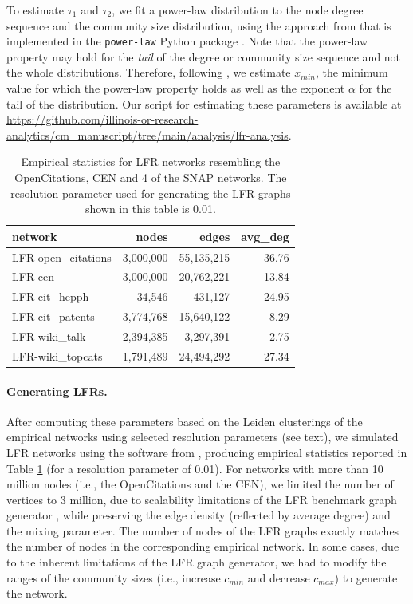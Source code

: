 \documentclass[11pt]{article}   	%
\begin{document}
To estimate $\tau_1$ and $\tau_2$, we fit a power-law distribution to the node degree sequence and the community size distribution, using the approach from \cite{clauset2009power} that is implemented in the \texttt{power-law} Python package \citep{alstott2014powerlaw}. Note that the power-law property may hold for the \textit{tail} of the degree or community size sequence and not the whole distributions. Therefore, following \cite{clauset2009power}, we estimate $x_{min}$, the minimum value for which the power-law property holds as well as the exponent $\alpha$ for the tail of the distribution. Our script for estimating these parameters is available at \href{https://github.com/illinois-or-research-analytics/cm_manuscript/tree/main/analysis/lfr-analysis}{https://github.com/illinois-or-research-analytics/cm\_manuscript/tree/main/analysis/lfr-analysis}.


\begin{table}[ht]
\caption{Empirical statistics for LFR networks resembling the OpenCitations, CEN and 4 of the SNAP networks. The resolution parameter used for generating the LFR graphs shown in this table is 0.01.}
\centering
\begin{tabular}{lrrr}
  \hline
 network & nodes & edges & avg\_deg \\
  \hline
    LFR-open\_citations & 3,000,000  & 55,135,215 & 36.76 \\
    LFR-cen & 3,000,000 & 20,762,221 & 13.84 \\
    LFR-cit\_hepph &  34,546 & 431,127 & 24.95 \\
    LFR-cit\_patents & 3,774,768 & 15,640,122 & 8.29 \\
    LFR-wiki\_talk & 2,394,385 & 3,297,391 & 2.75 \\
    LFR-wiki\_topcats & 1,791,489 & 24,494,292 & 27.34 \\
 \hline
\end{tabular}
\label{tab:empirical-stats-LFR}
\end{table}

\paragraph{Generating LFRs.} 
After computing these parameters based on the Leiden clusterings of the empirical networks using selected resolution parameters (see text), we simulated LFR networks using the software from \cite{lancichinetti2008benchmark}, producing empirical statistics reported in Table \ref{tab:empirical-stats-LFR} (for a resolution parameter of 0.01). For networks with more than 10 million nodes (i.e., the OpenCitations and the CEN), we limited the number of vertices to 3 million, due to scalability limitations of  the LFR benchmark graph generator \citep{slota2019scalable}, while preserving the edge density (reflected by average degree) and the mixing parameter.  The number of nodes of the LFR graphs exactly matches the number of nodes in the corresponding empirical network. In some cases, due to the inherent limitations of the LFR graph generator, we had to modify the ranges of the community sizes (i.e., increase $c_{min}$ and decrease $c_{max}$) to generate the network. 
\end{document}
